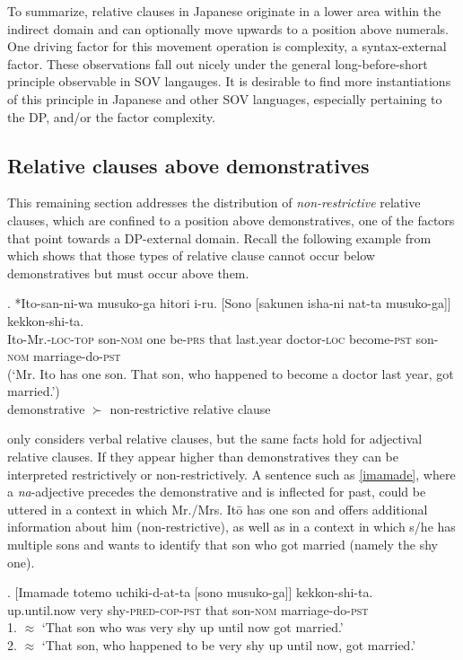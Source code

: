 To summarize, relative clauses in Japanese originate in a lower area within the indirect domain and can optionally move upwards to a position above numerals. One driving factor for this movement operation is complexity, a syntax-external factor. These observations fall out nicely under the general long-before-short principle observable in SOV langauges. It is desirable to find more instantiations of this principle in Japanese and other SOV languages, especially pertaining to the DP, and/or the factor complexity.

\subsection{Relative clauses above demonstratives} \label{RCs above dem}

This remaining section addresses the distribution of \textit{non-restrictive} relative clauses, which are confined to a position above demonstratives, one of the factors that point towards a DP-external domain. Recall the following example from \citet{ishizuka:2008:RC} which shows that those types of relative clause cannot occur below demonstratives but must occur above them.

\exg. *Ito-san-ni-wa musuko-ga hitori i-ru. [Sono [sakunen isha-ni nat-ta musuko-ga]] kekkon-shi-ta.\\
Ito-Mr.-\textsc{loc-top} son-\textsc{nom} one be-\textsc{prs} that last.year doctor-\textsc{loc} become-\textsc{pst} son-\textsc{nom} marriage-do-\textsc{pst}\\
(`Mr. Ito has one son. That son, who happened to become a doctor last year, got married.’) \\ \null \hfill *demonstrative $\succ$ non-restrictive relative clause \citep[5]{ishizuka:2008:RC}

\citet{ishizuka:2008:RC} only considers verbal relative clauses, but the same facts hold for adjectival relative clauses. If they appear higher than demonstratives they can be interpreted restrictively or non-restrictively. A sentence such as \ref{imamade}, where a \textit{na}-adjective precedes the demonstrative and is inflected for past, could be uttered in a context in which Mr./Mrs. Itō has one son and offers additional information about him (non-restrictive), as well as in a context in which s/he has multiple sons and wants to identify that son who got married (namely the shy one).

\exg. [Imamade totemo uchiki-d-at-ta [sono musuko-ga]] kekkon-shi-ta.\\
up.until.now very shy-\textsc{pred-cop-pst} that son-\textsc{nom} marriage-do-\textsc{pst}\\
1. $\approx$ `That son who was very shy up until now got married.’ \\
2. $\approx$ `That son, who happened to be very shy up until now, got married.’ \label{imamade}

